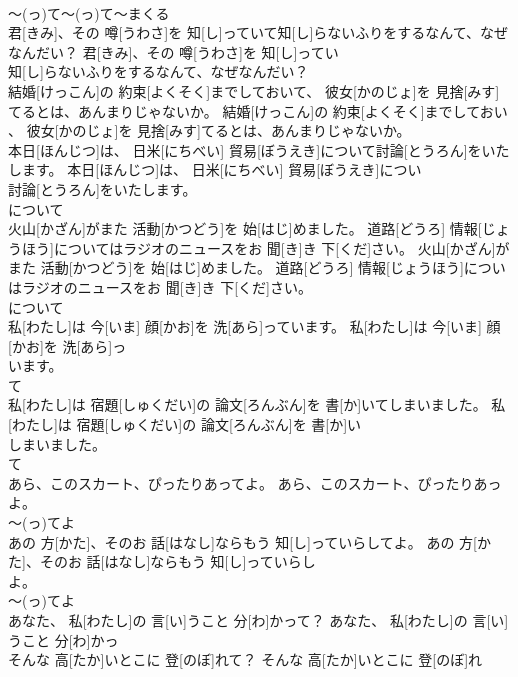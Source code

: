 \documentclass[8pt]{extreport}
\begin{document}
\begin{CJK}{UTF8}{min}
\\	～(っ)て～(っ)て～まくる
\\	君[きみ]、その 噂[うわさ]を 知[し]っていて知[し]らないふりをするなんて、なぜなんだい？	君[きみ]、その 噂[うわさ]を 知[し]ってい
\\	知[し]らないふりをするなんて、なぜなんだい？	
\\	結婚[けっこん]の 約束[よくそく]までしておいて、 彼女[かのじょ]を 見捨[みす]てるとは、あんまりじゃないか。	結婚[けっこん]の 約束[よくそく]までしておい
\\	、 彼女[かのじょ]を 見捨[みす]てるとは、あんまりじゃないか。	
\\	本日[ほんじつ]は、 日米[にちべい] 貿易[ぼうえき]について討論[とうろん]をいたします。	本日[ほんじつ]は、 日米[にちべい] 貿易[ぼうえき]につい
\\	討論[とうろん]をいたします。	
\\	について
\\	火山[かざん]がまた 活動[かつどう]を 始[はじ]めました。 道路[どうろ] 情報[じょうほう]についてはラジオのニュースをお 聞[き]き 下[くだ]さい。	火山[かざん]がまた 活動[かつどう]を 始[はじ]めました。 道路[どうろ] 情報[じょうほう]につい
\\	はラジオのニュースをお 聞[き]き 下[くだ]さい。	
\\	について
\\	私[わたし]は 今[いま] 顔[かお]を 洗[あら]っています。	私[わたし]は 今[いま] 顔[かお]を 洗[あら]っ
\\	います。	
\\	て 
\\	私[わたし]は 宿題[しゅくだい]の 論文[ろんぶん]を 書[か]いてしまいました。	私[わたし]は 宿題[しゅくだい]の 論文[ろんぶん]を 書[か]い
\\	しまいました。	
\\	て 
\\	あら、このスカート、ぴったりあってよ。	あら、このスカート、ぴったりあっ
\\	よ。	
\\	～(っ)てよ
\\	あの 方[かた]、そのお 話[はなし]ならもう 知[し]っていらしてよ。	あの 方[かた]、そのお 話[はなし]ならもう 知[し]っていらし
\\	よ。	
\\	～(っ)てよ
\\	あなた、 私[わたし]の 言[い]うこと 分[わ]かって？	あなた、 私[わたし]の 言[い]うこと 分[わ]かっ
\\	そんな 高[たか]いとこに 登[のぼ]れて？	そんな 高[たか]いとこに 登[のぼ]れ

\end{CJK}
\end{document}
